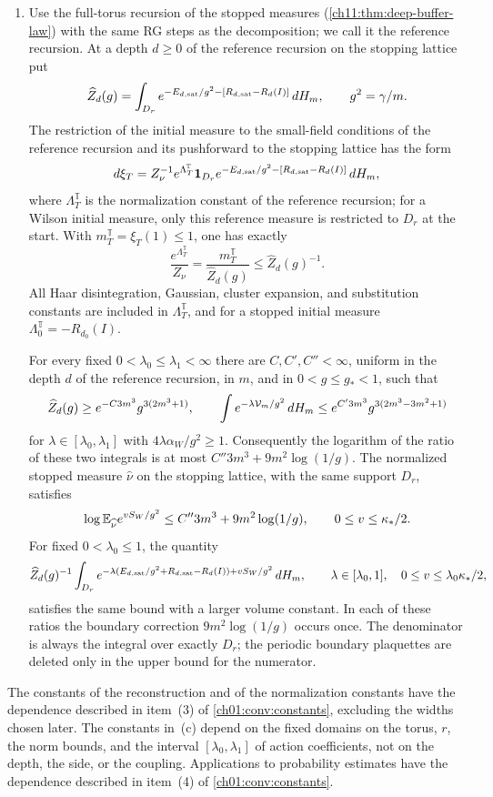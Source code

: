 \begin{theorem}
\begin{enumerate}
\item[(c)] Use the full-torus recursion of the stopped measures (\cref{ch11:thm:deep-buffer-law}) with the same RG steps as the decomposition; we call it the reference recursion. At a depth $d\ge0$ of the reference recursion on the stopping lattice put
\[
 \widehat Z_d(g)=\int_{D_r}e^{-E_{d,\mathrm{sat}}/g^2-[R_{d,\mathrm{sat}}-R_d(I)]}\,dH_m,\qquad g^2=\gamma/m.
\]
The restriction of the initial measure to the small-field conditions of the reference recursion and its pushforward to the stopping lattice has the form
\[
 d\xi_T=Z_\nu^{-1}e^{\Lambda_T^{\mathbb T}}\mathbf 1_{D_r}e^{-E_{d,\mathrm{sat}}/g^2-[R_{d,\mathrm{sat}}-R_d(I)]}\,dH_m,
\]
where $\Lambda_T^{\mathbb T}$ is the normalization constant of the reference recursion; for a Wilson initial measure, only this reference measure is restricted to $D_r$ at the start. With $m_T^{\mathbb T}=\xi_T(1)\le1$, one has exactly
\begin{equation}\label{ch19:eq:reference-identity}
 \frac{e^{\Lambda_T^{\mathbb T}}}{Z_\nu}=\frac{m_T^{\mathbb T}}{\widehat Z_d(g)}\le\widehat Z_d(g)^{-1}.
\end{equation}
All Haar disintegration, Gaussian, cluster expansion, and substitution constants are included in $\Lambda_T^{\mathbb T}$, and for a stopped initial measure $\Lambda_0^{\mathbb T}=-R_{d_0}(I)$.

For every fixed $0<\lambda_0\le\lambda_1<\infty$ there are $C,C',C''<\infty$, uniform in the depth $d$ of the reference recursion, in $m$, and in $0<g\le g_*<1$, such that
\[
 \widehat Z_d(g)\ge e^{-C3m^3}g^{3(2m^3+1)},\qquad
 \int e^{-\lambda\mathcal V_m/g^2}\,dH_m\le e^{C'3m^3}g^{3(2m^3-3m^2+1)}
\]
for $\lambda\in[\lambda_0,\lambda_1]$ with $4\lambda\alpha_W/g^2\ge1$. Consequently the logarithm of the ratio of these two integrals is at most $C''3m^3+9m^2\log(1/g)$. The normalized stopped measure $\widehat\nu$ on the stopping lattice, with the same support $D_r$, satisfies
\[
 \log\mathbb E_{\widehat\nu}e^{vS_W/g^2}\le C''3m^3+9m^2\log(1/g),\qquad 0\le v\le\kappa_*/2.
\]
For fixed $0<\lambda_0\le1$, the quantity
\[
 \widehat Z_d(g)^{-1}\int_{D_r}e^{-\lambda(E_{d,\mathrm{sat}}/g^2+R_{d,\mathrm{sat}}-R_d(I))+vS_W/g^2}\,dH_m,
 \qquad\lambda\in[\lambda_0,1],\quad0\le v\le\lambda_0\kappa_*/2,
\]
satisfies the same bound with a larger volume constant. In each of these ratios the boundary correction $9m^2\log(1/g)$ occurs once. The denominator is always the integral over exactly $D_r$; the periodic boundary plaquettes are deleted only in the upper bound for the numerator.
\end{enumerate}
The constants of the reconstruction and of the normalization constants have the dependence described in item~(3) of \cref{ch01:conv:constants}, excluding the widths chosen later. The constants in~(c) depend on the fixed domains on the torus, $r$, the norm bounds, and the interval $[\lambda_0,\lambda_1]$ of action coefficients, not on the depth, the side, or the coupling. Applications to probability estimates have the dependence described in item~(4) of \cref{ch01:conv:constants}.
\end{theorem}

